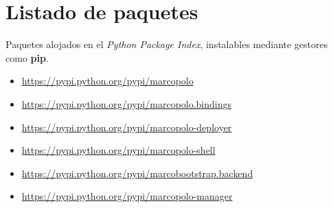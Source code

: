 \chapter{Listado de paquetes}
\label{paquetes}

Paquetes alojados en el \textit{Python Package Index}, instalables mediante gestores como \textbf{pip}.

\begin{itemize}[noitemsep]
\item \href{https://pypi.python.org/pypi/marcopolo}{https://pypi.python.org/pypi/marcopolo}
\item \href{https://pypi.python.org/pypi/marcopolo.bindings}{https://pypi.python.org/pypi/marcopolo.bindings}
\item \href{https://pypi.python.org/pypi/marcopolo-deployer}{https://pypi.python.org/pypi/marcopolo-deployer}
\item \href{https://pypi.python.org/pypi/marcopolo-shell}{https://pypi.python.org/pypi/marcopolo-shell}
\item \href{https://pypi.python.org/pypi/marcobootstrap.backend}{https://pypi.python.org/pypi/marcobootstrap.backend}
\item \href{https://pypi.python.org/pypi/marcopolo-manager}{https://pypi.python.org/pypi/marcopolo-manager}
\end{itemize}